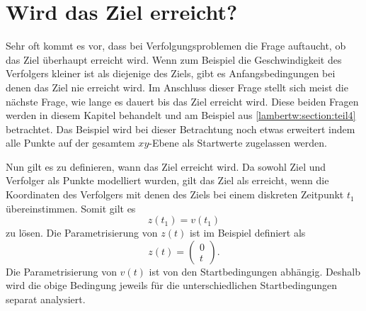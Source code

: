 %
%
%
\section{Wird das Ziel erreicht?
\label{lambertw:section:Wird_das_Ziel_erreicht}}
%
Sehr oft kommt es vor, dass bei Verfolgungsproblemen die Frage auftaucht, ob das Ziel überhaupt erreicht wird.
Wenn zum Beispiel die Geschwindigkeit des Verfolgers kleiner ist als diejenige des Ziels, gibt es Anfangsbedingungen bei denen das Ziel nie erreicht wird.
Im Anschluss dieser Frage stellt sich meist die nächste Frage, wie lange es dauert bis das Ziel erreicht wird.
Diese beiden Fragen werden in diesem Kapitel behandelt und am Beispiel aus \ref{lambertw:section:teil4} betrachtet.
Das Beispiel wird bei dieser Betrachtung noch etwas erweitert indem alle Punkte auf der gesamtem $xy$-Ebene als Startwerte zugelassen werden.

Nun gilt es zu definieren, wann das Ziel erreicht wird.
Da sowohl Ziel und Verfolger als Punkte modelliert wurden, gilt das Ziel als erreicht, wenn die Koordinaten des Verfolgers mit denen des Ziels bei einem diskreten Zeitpunkt $t_1$ übereinstimmen.
Somit gilt es
%
\begin{equation*}
    z(t_1)=v(t_1)
\end{equation*}
%
zu lösen.
Die Parametrisierung von $z(t)$ ist im Beispiel definiert als
\begin{equation}
    z(t)
    =
    \left( \begin{array}{c} 0 \\ t \end{array} \right)\text{.}
\end{equation}
%
Die Parametrisierung von $v(t)$ ist von den Startbedingungen abhängig. Deshalb wird die obige Bedingung jeweils für die unterschiedlichen Startbedingungen separat analysiert.
%
